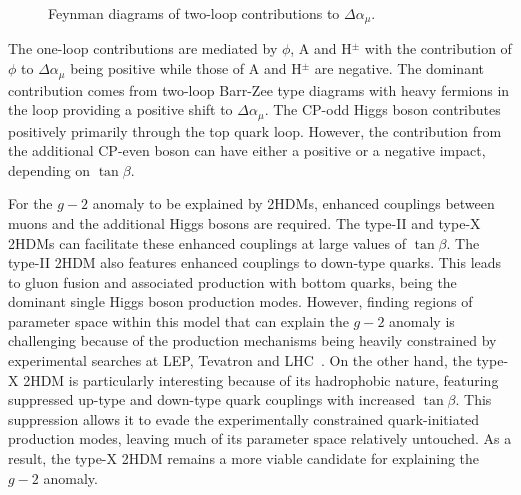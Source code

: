 \begin{figure}[h]
    \centering
    \begin{subfigure}{0.45\textwidth}
        \centering
        
    \end{subfigure}
    \hfill
    \begin{subfigure}{0.45\textwidth}
        \centering
        
    \end{subfigure}
    
    \vspace{0.5cm}

    \begin{subfigure}{0.45\textwidth}
        \centering
        
    \end{subfigure}

    \caption{Feynman diagrams of two-loop contributions to $\Delta\alpha_\mu$.}
    \label{Figure:Chapter2_TwoBarrZee}
\end{figure}


The one-loop contributions are mediated by $\phi$, A and H$^{\pm}$ with the contribution of $\phi$ to $\Delta\alpha_\mu$ being positive while those of A and H$^{\pm}$ are negative. The dominant contribution comes from two-loop Barr-Zee type diagrams with heavy fermions in the loop providing a positive shift to $\Delta\alpha_\mu$. The CP-odd Higgs boson contributes positively primarily through the top quark loop. However, the contribution from the additional CP-even boson can have either a positive or a negative impact, depending on $\tan{\beta}$. 

For the $g-2$ anomaly to be explained by 2HDMs, enhanced couplings between muons and the additional Higgs bosons are required. The type-II and type-X 2HDMs can facilitate these enhanced couplings at large values of $\tan{\beta}$. The type-II 2HDM also features enhanced couplings to down-type quarks. This leads to gluon fusion and associated production with bottom quarks, being the dominant single Higgs boson production modes. However, finding regions of parameter space within this model that can explain the $g-2$ anomaly is challenging because of the production mechanisms being heavily constrained by experimental searches at LEP, Tevatron and LHC~\cite{TypeX_2HDM}. On the other hand, the type-X 2HDM is particularly interesting because of its hadrophobic nature, featuring suppressed up-type and down-type quark couplings with increased $\tan{\beta}$. This suppression allows it to evade the experimentally constrained quark-initiated production modes, leaving much of its parameter space relatively untouched. As a result, the type-X 2HDM remains a more viable candidate for explaining the $g-2$ anomaly. 

